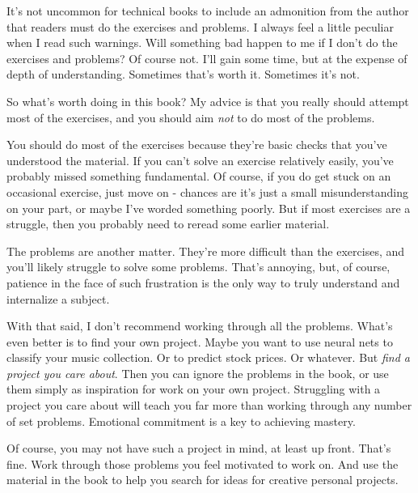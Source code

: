 
It's not uncommon for technical books to include an admonition from the author that readers must do the exercises and problems. I always feel a little peculiar when I read such warnings. Will something bad happen to me if I don't do the exercises and problems? Of course not. I'll gain some time, but at the expense of depth of understanding. Sometimes that's worth it. Sometimes it's not.


So what's worth doing in this book? My advice is that you really should attempt most of the exercises, and you should aim \emph{not} to do most of the problems.


You should do most of the exercises because they're basic checks that you've understood the material. If you can't solve an exercise relatively easily, you've probably missed something fundamental. Of course, if you do get stuck on an occasional exercise, just move on - chances are it's just a small misunderstanding on your part, or maybe I've worded something poorly. But if most exercises are a struggle, then you probably need to reread some earlier material.


The problems are another matter. They're more difficult than the exercises, and you'll likely struggle to solve some problems. That's annoying, but, of course, patience in the face of such frustration is the only way to truly understand and internalize a subject.


With that said, I don't recommend working through all the problems. What's even better is to find your own project. Maybe you want to use neural nets to classify your music collection. Or to predict stock prices. Or whatever. But \emph{find a project you care about}. Then you can ignore the problems in the book, or use them simply as inspiration for work on your own project. Struggling with a project you care about will teach you far more than working through any number of set problems. Emotional commitment is a key to achieving mastery.


Of course, you may not have such a project in mind, at least up front. That's fine. Work through those problems you feel motivated to work on. And use the material in the book to help you search for ideas for creative personal projects.
